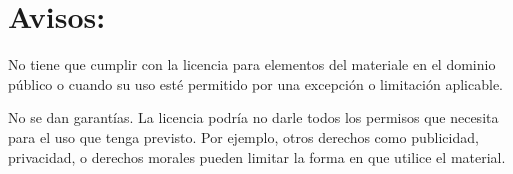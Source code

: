 \section*{Avisos:}

No tiene que cumplir con la licencia para elementos del materiale en el dominio
público o cuando su uso esté permitido por una excepción o limitación
aplicable.

No se dan garantías. La licencia podría no darle todos los permisos que
necesita para el uso que tenga previsto. Por ejemplo, otros derechos como
publicidad, privacidad, o derechos morales pueden limitar la forma en que
utilice el material.

